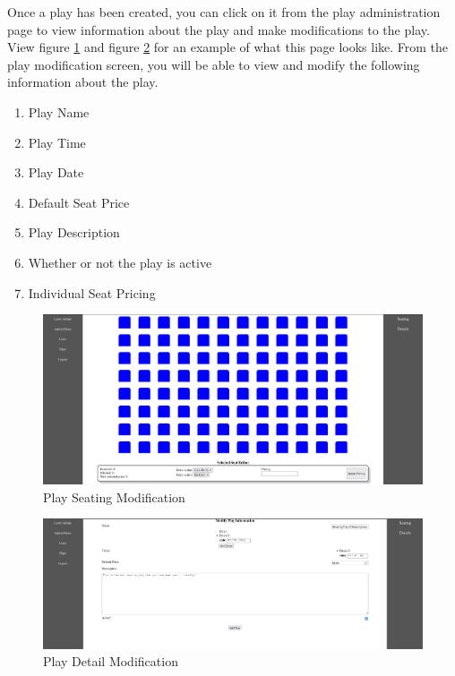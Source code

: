 Once a play has been created, you can click on it from the play administration page to view information about the play and make modifications to the play. View figure \ref{fig:admin_area_modify_seating} and figure \ref{fig:admin_area_modify_details} for an example of what this page looks like. From the play modification screen, you will be able to view and modify the following information about the play.

\begin{enumerate}
    \item Play Name
    \item Play Time
    \item Play Date
    \item Default Seat Price
    \item Play Description
    \item Whether or not the play is active
    \item Individual Seat Pricing
\end{enumerate}

\begin{figure}[ht]
    \centering
    \includegraphics[width=14cm]{images/chapter2/admin area modify seating}
    \caption{Play Seating Modification}
    \label{fig:admin_area_modify_seating}
\end{figure}

\begin{figure}[ht]
    \centering
    \includegraphics[width=14cm]{images/chapter2/admin area modify details}
    \caption{Play Detail Modification}
    \label{fig:admin_area_modify_details}
\end{figure}

